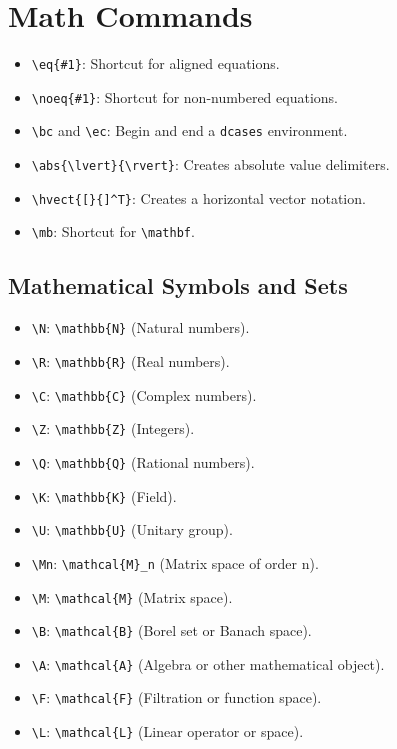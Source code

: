 \documentclass[12pt,twoside]{report}
\begin{document}
\section{Math Commands}
\begin{itemize}
    \item \verb|\eq{#1}|: Shortcut for aligned equations.
    \item \verb|\noeq{#1}|: Shortcut for non-numbered equations.
    \item \verb|\bc| and \verb|\ec|: Begin and end a \verb|dcases| environment.
    \item \verb|\abs{\lvert}{\rvert}|: Creates absolute value delimiters.
    \item \verb|\hvect{[}{]^T}|: Creates a horizontal vector notation.
    \item \verb|\mb|: Shortcut for \verb|\mathbf|.
\end{itemize}

\subsection{Mathematical Symbols and Sets}
\begin{itemize}
    \item \verb|\N|: \verb|\mathbb{N}| (Natural numbers).
    \item \verb|\R|: \verb|\mathbb{R}| (Real numbers).
    \item \verb|\C|: \verb|\mathbb{C}| (Complex numbers).
    \item \verb|\Z|: \verb|\mathbb{Z}| (Integers).
    \item \verb|\Q|: \verb|\mathbb{Q}| (Rational numbers).
    \item \verb|\K|: \verb|\mathbb{K}| (Field).
    \item \verb|\U|: \verb|\mathbb{U}| (Unitary group).
    \item \verb|\Mn|: \verb|\mathcal{M}_n| (Matrix space of order n).
    \item \verb|\M|: \verb|\mathcal{M}| (Matrix space).
    \item \verb|\B|: \verb|\mathcal{B}| (Borel set or Banach space).
    \item \verb|\A|: \verb|\mathcal{A}| (Algebra or other mathematical object).
    \item \verb|\F|: \verb|\mathcal{F}| (Filtration or function space).
    \item \verb|\L|: \verb|\mathcal{L}| (Linear operator or space).
\end{itemize}
\end{document}
